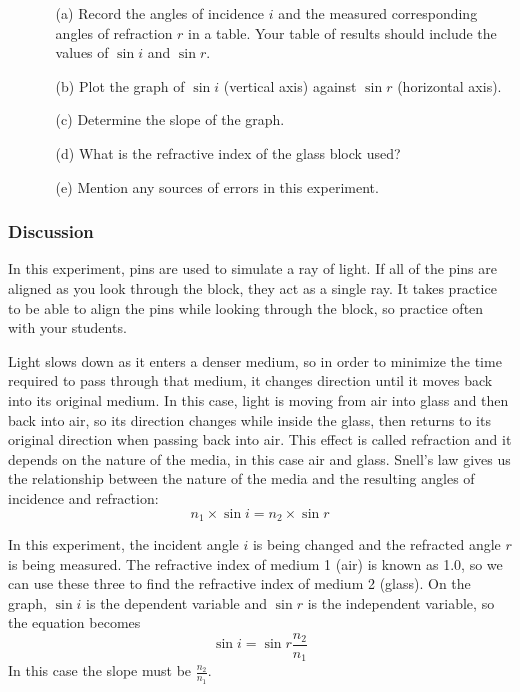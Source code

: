 \begin{enumerate}
\item[]
\begin{enumerate}
\item[(a)]{Record the angles of incidence $i$ and the measured corresponding angles of
refraction $r$ in a table. Your table of results should include the values of
$\sin{i}$ and $\sin{r}$.}
\item[(b)]{Plot the graph of $\sin{i}$ (vertical axis) against $\sin{r}$ (horizontal axis).}
\item[(c)]{Determine the slope of the graph.}
\item[(d)]{What is the refractive index of the glass block used?}
\item[(e)]{Mention any sources of errors in this experiment.}
\end{enumerate}
\end{enumerate}

\subsubsection{Discussion}

In this experiment, pins are used to simulate a ray of light. If all of the pins are
aligned as you look through the block, they act as a single ray. It takes practice to be able
to align the pins while looking through the block, so practice often with your students.

Light slows down as it enters a denser medium, so in order to minimize the time
required to pass through that medium, it changes direction until it moves back into its
original medium. In this case, light is moving from air into glass and then back into air,
so its direction changes while inside the glass, then returns to its original direction when
passing back into air. This effect is called refraction and it depends on the nature of the
media, in this case air and glass. Snell’s law gives us the relationship between the nature
of the media and the resulting angles of incidence and refraction:
$$n_1 \times \sin{i} = n_2 \times \sin{r}$$

In this experiment, the incident angle $i$ is being changed and the refracted angle $r$
is being measured. The refractive index of medium 1 (air) is known as 1.0, so we can use
these three to find the refractive index of medium 2 (glass). On the graph, $\sin{i}$ is the
dependent variable and $\sin{r}$ is the independent variable, so the equation becomes
$$\sin{i} = \sin{r} \frac{n_2}{n_1}$$
In this case the slope must be $\frac{n_2}{n_1}$.

